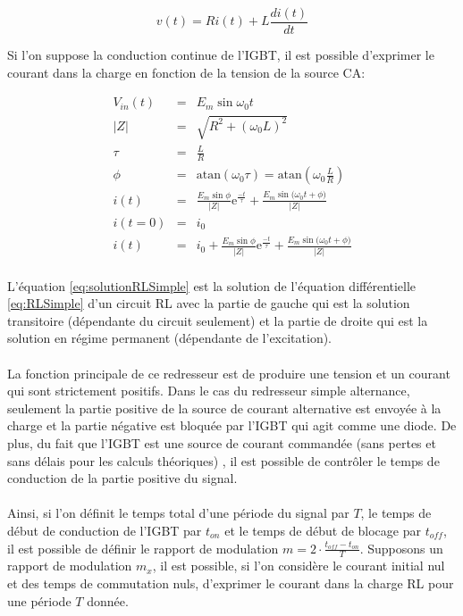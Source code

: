\begin{equation}
\label{eq:RLSimple}
v(t) = R i(t) + L \frac{d i(t)}{dt}
\end{equation}

Si l'on suppose la conduction continue de l'IGBT, il est possible d'exprimer le courant dans la charge en fonction de la tension de la source CA:

\begin{eqnarray}
V_{in}(t) &=& E_m\sin{\omega_0 t} \\
|Z| &=& \sqrt{R^2 + (\omega_0 L)^2} \\
\tau &=& \frac{L}{R}\\
\phi &=& \mbox{atan}(\omega_0 \tau) = \mbox{atan}(\omega_0 \frac{L}{R}) \\
\label{eq:solutionRLSimple} i(t) &=& \frac{E_m\sin{\phi}}{|Z|}\mbox{e}^{\frac{-t}{\tau}} + \frac{E_m\sin{(\omega_0 t + \phi})}{|Z|}\\
i(t=0) &=& i_0\\
i(t) &=& i_0  + \frac{E_m\sin{\phi}}{|Z|}\mbox{e}^{\frac{-t}{\tau}} + \frac{E_m\sin{(\omega_0 t + \phi})}{|Z|} \\
\end{eqnarray}

L'équation \ref{eq:solutionRLSimple} est la solution de l'équation différentielle \ref{eq:RLSimple} d'un circuit RL avec la partie de gauche qui est la solution transitoire (dépendante du circuit seulement) et la partie de droite qui est la solution en régime permanent (dépendante de l'excitation). 

\paragraph{}
La fonction principale de ce redresseur est de produire une tension et un courant qui sont strictement positifs. Dans le cas du redresseur simple alternance, seulement la partie positive de la source de courant alternative est envoyée à la charge et la partie négative est bloquée par l'IGBT qui agit comme une diode. De plus, du fait que l'IGBT est une source de courant commandée (sans pertes et sans délais pour les calculs théoriques) , il est possible de contrôler le temps de conduction de la partie positive du signal.

\paragraph{}Ainsi, si l'on définit le temps total d'une période du signal par $T$, le temps de début de conduction de l'IGBT par $t_{on}$ et le temps de début de blocage par $t_{off}$, il est possible de définir le rapport de modulation $m = 2\cdot \frac{t_{off}-t_{on}}{T}$. Supposons un rapport de modulation $m_x$, il est possible, si l'on considère le courant initial nul et des temps de commutation nuls, d'exprimer le courant dans la charge RL pour une période $T$ donnée.

